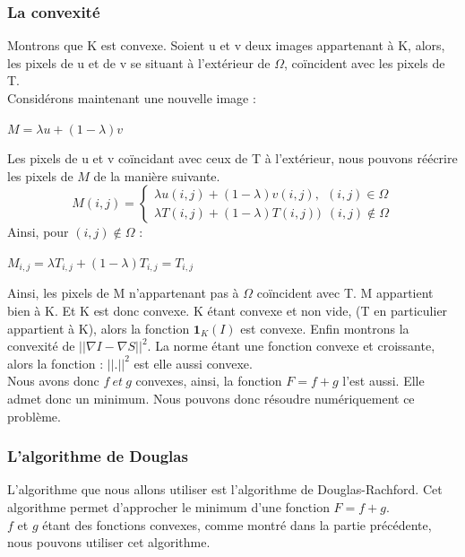 \subsubsection{La convexité}
Montrons que K est convexe. 
Soient u et v deux images appartenant à K, alors, les pixels de u et de v se situant à l'extérieur de $\Omega$, coïncident avec les pixels de T. \\
Considérons maintenant une nouvelle image : 
\begin{center}
$M = \lambda u+(1-\lambda)v$
\end{center}
Les pixels de u et v coïncidant avec ceux de T à l'extérieur, nous pouvons réécrire les pixels de $M$ de la manière suivante. \\

\begin{equation*} 
M (i,j) = 
\left\{
\begin{aligned}
\lambda u(i,j) +(1-\lambda) v(i,j), \ \ (i,j) \in \Omega\\
\lambda T(i,j) +(1-\lambda )T(i,j))  \ \ (i,j)\notin \Omega
\end{aligned}
\right.
\end{equation*}
Ainsi, pour $(i,j) \notin \Omega$ : \\
\begin{center}
$M_{i,j} = \lambda T_{i,j}+(1-\lambda) T_{i,j} = T_{i,j}$
\end{center}
Ainsi, les pixels de M n'appartenant pas à $\Omega$ coïncident avec T. M appartient bien à K. Et K est donc convexe.\newline
K étant convexe et non vide, (T en particulier appartient à K), alors la fonction $\mathbf{1}_K(I)$ est convexe. \newline
Enfin montrons la convexité de $||\nabla I-\nabla S||^2$.\newline
La norme étant une fonction convexe et croissante, alors la fonction : $||.||^2$ est elle aussi convexe. \\
Nous avons donc $f\ et\ g$ convexes, ainsi, la fonction $F =f+g$ l'est aussi. Elle admet donc un minimum. Nous pouvons donc résoudre numériquement ce problème.
\subsubsection{L'algorithme de Douglas}
L'algorithme que nous allons utiliser est l'algorithme de Douglas-Rachford. Cet algorithme permet d'approcher le minimum d'une fonction $F = f+g$. \\
 $f$ et $g$ étant des fonctions convexes, comme montré dans la partie précédente, nous pouvons utiliser cet algorithme.
